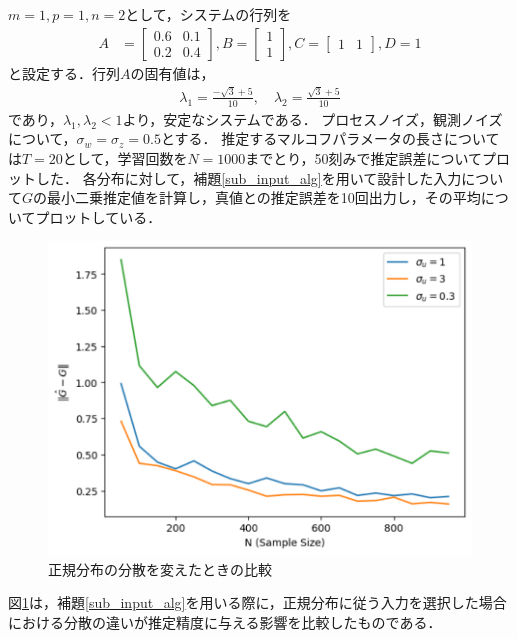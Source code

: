 $m = 1, p = 1, n = 2$として，システムの行列を
\begin{align*}
    A &= 
    \begin{bmatrix}
        0.6 & 0.1 \\
        0.2 & 0.4
    \end{bmatrix},
    B =
    \begin{bmatrix}
        1 \\
        1
    \end{bmatrix},
        C =
    \begin{bmatrix}
        1 & 1 
    \end{bmatrix}, 
    D = 1
\end{align*}
と設定する．行列$A$の固有値は，
\begin{align*}
    \lambda_1 = \frac{-\sqrt{3}+5}{10}, \quad \lambda_2 = \frac{\sqrt{3}+5}{10}
\end{align*}
であり，$\lambda_1, \lambda_2 <1$より，安定なシステムである．
プロセスノイズ，観測ノイズについて，$\sigma_w = \sigma_z = 0.5$とする．
推定するマルコフパラメータの長さについては$T = 20$として，学習回数を$N = 1000$までとり，50刻みで推定誤差についてプロットした．
各分布に対して，補題\ref{sub_input_alg}を用いて設計した入力について$G$の最小二乗推定値を計算し，真値との推定誤差を10回出力し，その平均についてプロットしている．

\begin{figure}[htbp]
    \centering
    \includegraphics[width=0.8\linewidth]{figure/figure1.pdf}
    \caption{正規分布の分散を変えたときの比較}
    \label{sigma_change}
\end{figure}

図\ref{sigma_change}は，補題\ref{sub_input_alg}を用いる際に，正規分布に従う入力を選択した場合における分散の違いが推定精度に与える影響を比較したものである．


